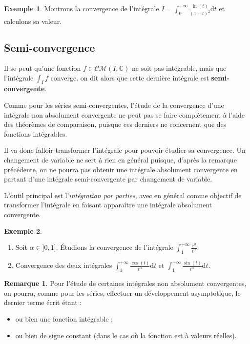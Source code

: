\documentclass[french]{article}
\newcommand{\C}{\mathbb{C}}
\renewcommand{\d}{\text{d}}
\theoremstyle{plain}
\theoremstyle{definition}
\newtheorem*{ex}{Exemple}
\newtheorem*{rmq}{Remarque}
\theoremstyle{remark}
\begin{document}
\begin{ex}
	Montrons la convergence de l'intégrale $I=\displaystyle\int_{0}^{+\infty}\frac{\ln(t)}{(1+t)^2}\d t$ et calculons sa valeur.
\end{ex}

\subsection{Semi-convergence}

Il se peut qu'une fonction $f\in\mathcal{CM}(I,\C)$ ne soit pas intégrable, mais que l'intégrale $\displaystyle\int_I f$ converge. on dit alors que cette dernière intégrale est \textbf{semi-convergente}.


Comme pour les séries semi-convergentes, l'étude de la convergence d'une intégrale non absolument convergente ne peut pas se faire complètement à l'aide des théorèmes de comparaison, puisque ces derniers ne concernent que des fonctions intégrables.


Il va donc falloir transformer l'intégrale pour pouvoir étudier sa convergence. Un changement de variable ne sert à rien en général puisque, d'après la remarque précédente, on ne pourra pas obtenir une intégrale absolument convergente en partant d'une intégrale semi-convergente par changement de variable.


L'outil principal est l'\textit{intégration par parties}, avec en général comme objectif de transformer l'intégrale en faisant apparaître une intégrale absolument convergente.

\begin{ex}
	\begin{enumerate}
		\item Soit $\alpha\in]0,1]$. Étudions la convergence de l'intégrale $\displaystyle\int_{1}^{+\infty}\frac{e^{it}}{t^{\alpha}}$.
		\item Convergence des deux intégrales $\displaystyle\int_{1}^{+\infty}\frac{\cos(t)}{t^{\alpha}}\d t$ et $\displaystyle\int_{1}^{+\infty}\frac{\sin(t)}{t^{\alpha}}\d t$.
	\end{enumerate}
\end{ex}

\begin{rmq}
	Pour l'étude de certaines intégrales non absolument convergentes, on pourra, comme pour les séries, effectuer un développement asymptotique, le dernier terme écrit étant :
	\begin{itemize}
		\item ou bien une fonction intégrable ;
		\item ou bien de signe constant (dans le cas où la fonction est à valeurs réelles).
	\end{itemize}
\end{rmq}
\end{document}
